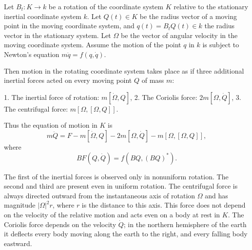 Let $B_t: K \to k$ be a rotation of the coordinate system $K$ relative to the stationary inertial coordinate system $k$. Let $Q(t) \in K$ be the radius vector of a moving point in the moving coordinate system, and $q(t) = B_t Q(t) \in k$ the radius vector in the stationary system. Let $\Omega$ be the vector of angular velocity in the moving coordinate system. Assume the motion of the point $q$ in $k$ is subject to Newton's equation $m\ddot{q} = f(q, \dot{q})$.

Then motion in the rotating coordinate system takes place as if three additional inertial forces acted on every moving point $Q$ of mass $m$:

1. The inertial force of rotation: $m[\dot{\Omega}, Q]$,
2. The Coriolis force: $2m[\Omega, \dot{Q}]$,
3. The centrifugal force: $m[\Omega, [\Omega, Q]]$.

Thus the equation of motion in $K$ is
$$
m\ddot{Q} = F - m[\dot{\Omega}, Q] - 2m[\Omega, \dot{Q}] - m[\Omega, [\Omega, Q]],
$$
where
$$
BF(Q, \dot{Q}) = f(BQ, (BQ)^*).
$$

The first of the inertial forces is observed only in nonuniform rotation. The second and third are present even in uniform rotation. The centrifugal force is always directed outward from the instantaneous axis of rotation $\Omega$ and has magnitude $|\Omega|^2 r$, where $r$ is the distance to this axis. This force does not depend on the velocity of the relative motion and acts even on a body at rest in $K$. The Coriolis force depends on the velocity $\dot{Q}$; in the northern hemisphere of the earth it deflects every body moving along the earth to the right, and every falling body eastward.
